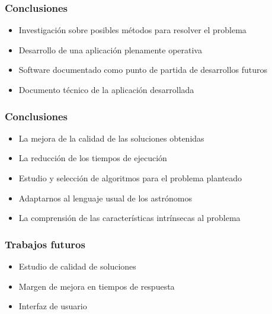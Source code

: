 
\begin{frame}
    \frametitle{Conclusiones}
    \begin{itemize}[<+->]
    \item Investigación sobre posibles métodos para resolver el problema
\item Desarrollo de una aplicación plenamente operativa
\item Software documentado como punto de partida de desarrollos futuros
\item Documento técnico de la aplicación desarrollada
    \end{itemize}
    \endblock{}
\end{frame}


\begin{frame}
    \frametitle{Conclusiones}
    \begin{itemize}[<+->]
\item La mejora de la calidad de las soluciones obtenidas
\item La reducción de los tiempos de ejecución
\item Estudio y selección de algoritmos para el problema planteado
\item Adaptarnos al lenguaje usual de los astrónomos
\item La comprensión de las características intrínsecas al problema
    \end{itemize}
    \endblock{}
\end{frame}

\begin{frame}
\frametitle{Trabajos futuros}
    \begin{itemize}[<+->]
    \item Estudio de calidad de soluciones
    \item Margen de mejora en tiempos de respuesta
    \item Interfaz de usuario
    \end{itemize}
    \endblock{}
\end{frame}
